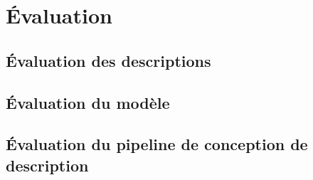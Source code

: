 \chapter{Évaluation}
\label{chap:evaluation}

\todo{}

\section{Évaluation des descriptions}

\todo{}

\section{Évaluation du modèle}

\todo{}

\section{Évaluation du pipeline de conception de description}

\todo{}